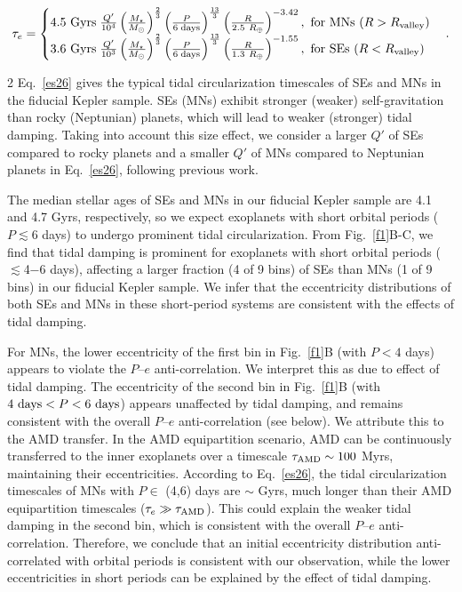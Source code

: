 \documentclass[10pt]{article}
\begin{document}
\begin{equation}
\label{es26}
\tau_e =
\begin{cases}
4.5~{\rm Gyrs} \; \frac{Q'}{10^4}  \left(\frac{M_\star}{M_\odot}\right)^{\frac{2}{3}}  \left({\frac{P}{6\;{\rm days}}}\right)^{\frac{13}{3}} \left({\frac{R}{2.5~R_\oplus}}\right)^{-3.42}, ~{\rm for~MNs}  ~(R>R_{\rm  valley}) \\
3.6~{\rm Gyrs} \; \frac{Q'}{10^3}  \left(\frac{M_\star}{M_\odot}\right)^{\frac{2}{3}}  \left({\frac{P}{6\;{\rm days}}}\right)^{\frac{13}{3}} \left({\frac{R}{1.3~R_\oplus}}\right)^{-1.55}, ~{\rm for~SEs}  ~(R<R_{\rm  valley})
\end{cases}
.
\end{equation}

\begin{multicols}{2}
\noindent Eq.~\ref{es26} gives the typical tidal circularization timescales of SEs and MNs in the fiducial Kepler sample.
SEs (MNs) exhibit stronger (weaker) self-gravitation than rocky (Neptunian) planets, which will lead to weaker (stronger) tidal damping.
Taking into account this size effect\cite{2012ApJ...746..150E}, we consider a larger $Q'$ of SEs compared to rocky planets and a smaller $Q'$ of MNs compared to Neptunian planets in Eq.~\ref{es26}, following previous work\cite{2023ApJ...958L..21L}.

The median stellar ages of SEs and MNs in our fiducial Kepler sample are 4.1 and 4.7 Gyrs, respectively, so we expect exoplanets with short orbital periods ($P\lesssim6$ days) to undergo prominent tidal circularization.
From Fig.~\ref{f1}B-C, we find that tidal damping is prominent for exoplanets with short orbital periods ($\lesssim$4−6 days), affecting a larger fraction (4 of 9 bins) of SEs than MNs (1 of 9 bins) in our fiducial Kepler sample.
We infer that the eccentricity distributions of both SEs and MNs in these short-period systems are consistent with the effects of tidal damping.

For MNs, the lower eccentricity of the first bin in Fig.~\ref{f1}B (with $P<4$ days) appears to violate the $P$--$e$ anti-correlation.
We interpret this as due to effect of tidal damping.
The eccentricity of the second bin in Fig.~\ref{f1}B (with $4~{\rm days}<P<6~{\rm days}$) appears unaffected by tidal damping, and remains consistent with the overall $P$--$e$ anti-correlation (see below).
We attribute this to the AMD transfer.
In the AMD equipartition scenario, AMD can be continuously transferred to the inner exoplanets over a timescale $\tau_{\rm AMD}\sim100$ Myrs\cite{2011ApJ...735..109W}, maintaining their eccentricities.
According to Eq.~\ref{es26}, the tidal circularization timescales of MNs with $P\in$ (4,6) days are $\sim$ Gyrs, much longer than their AMD equipartition timescales ($\tau_e \gg \tau_{\rm AMD}$).
This could explain the weaker tidal damping in the second bin, which is consistent with the overall $P$--$e$ anti-correlation.
Therefore, we conclude that an initial eccentricity distribution anti-correlated with orbital periods is consistent with our observation, while the lower eccentricities in short periods can be explained by the effect of tidal damping.


\end{multicols}
\end{document}
